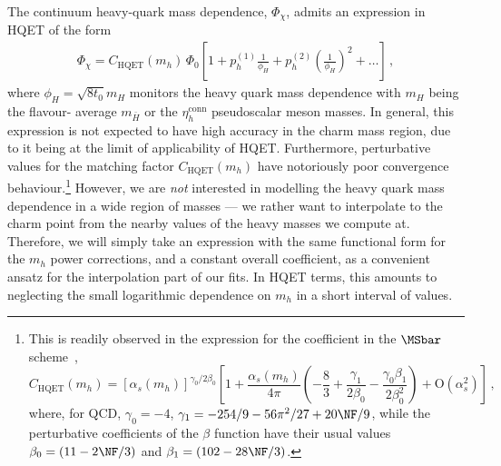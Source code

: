 The continuum heavy-quark mass dependence, $\Phi_\chi$, admits an expression in HQET of the form
\begin{align}
	\Phi_{\chi} = C_{\mathrm{HQET}}(m_h)\, \Phi_0 \left[ 1 + p_h^{(1)} \frac{1}{\phi_H} + p_h^{(2)} \left( \frac{1}{\phi_H} \right)^2 + \dots \right]
	\,,
	\label{eq:phichi}
\end{align}
where $\phi_H=\sqrt{8t_0}m_H$ monitors the heavy quark mass dependence with $m_H$ being the flavour-
average $m_{\bar{H}}$ or the $\eta_h^{\mathrm{conn}}$ pseudoscalar meson masses.
In general, this expression is not expected to have high accuracy in the charm mass region,
due to it being at the limit of applicability of HQET. Furthermore, perturbative values
for the matching factor $C_{\mathrm{HQET}}(m_h)$ have notoriously poor convergence behaviour.\footnote{This
is readily observed in the expression for the coefficient in the $\MSbar$ scheme~\cite{Manohar:2000dt,
	Ji:1991pr},  
\begin{equation} %
	C_{\mathrm{HQET}}(m_h) = \left[\alpha_s(m_h)\right]^{{\gamma_0}/{2\beta_0}} \left[1 + \frac{\alpha_s(m_h)}{4\pi}
	\left(-\frac{8}{3} + \frac{\gamma_1}{2\beta_0} - \frac{\gamma_0\beta_1}{2\beta_0^2} \right) + {\mathrm{O}}(\alpha_s^2) \right]\,,
	\label{eq:Wilson-coefficient}
\end{equation}
where, for QCD, $\gamma_0 = -4$, $\gamma_1 = -254/9 - 56\pi^2/27 + 20 \NF/9$, while
the perturbative coefficients of the $\beta$ function have their usual values
$\beta_0 = (11 - 2\NF/3)$ and $\beta_1 = (102 - 28\NF/3)$.
}
However, we are {\em not} interested in modelling the heavy quark mass dependence in a wide
region of masses --- we rather want to interpolate to the charm point from the nearby values
of the heavy masses we compute at. Therefore, we will simply take an expression with
the same functional form for the $m_h$ power corrections, and a constant overall coefficient,
as a convenient ansatz for the interpolation part of our fits. In HQET terms, this amounts
to neglecting the small logarithmic dependence on $m_h$ in a short interval of values.

